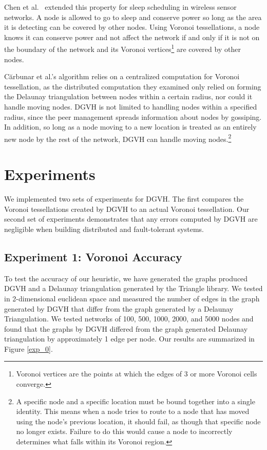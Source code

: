 Chen et al.\ \cite{chen2008voronoi} extended this property for sleep scheduling in wireless sensor networks.
A node is allowed to go to sleep and conserve power so long as the area it is detecting can be covered by other nodes.
Using Voronoi tessellations, a node knows it can conserve power and not affect the network if and only if it is not on the boundary of the network and its Voronoi vertices\footnote{Voronoi vertices are the points at which the edges of 3 or more Voronoi cells converge.} are covered by other nodes.


C\u{a}rbunar et al.'s algorithm relies on a centralized computation for Voronoi tessellation, as the distributed computation they examined only relied on forming the Delaunay triangulation between nodes within a certain radius, nor could it handle moving nodes.
DGVH is not limited to handling nodes within a specified radius, since the peer management spreads information about nodes by gossiping. %
In addition, so long as a node moving to a new location is treated as an entirely new node by the rest of the network, DGVH can handle moving nodes.\footnote{A specific node and a specific location must be bound together into a single identity.
This means when a node tries to route to a node that has moved using the node's previous location, it should fail, as though that specific node no longer exists.  
Failure to do this would cause a node to incorrectly determines what falls within its Voronoi region.}


\section{Experiments}
\label{sec:experiments}


We implemented two sets of experiments for DGVH.
The first compares the Voronoi tessellations created by DGVH to an actual Voronoi tessellation.
Our second set of experiments demonstrates that any errors computed by DGVH are negligible when building distributed and fault-tolerant systems.

\subsection{Experiment 1: Voronoi Accuracy}

To test the accuracy of our heuristic, we have generated the graphs produced DGVH and a Delaunay triangulation generated by the Triangle \cite{shewchuk96b} library.
We tested in 2-dimensional euclidean space and measured the number of edges in the graph generated by DGVH that differ from the graph generated by a Delaunay Triangulation.
We tested networks of 100, 500, 1000, 2000, and 5000 nodes and found that the graphs by DGVH differed from the graph generated Delaunay triangulation by approximately 1 edge per node.
Our results are summarized in Figure \ref{exp_0}.


